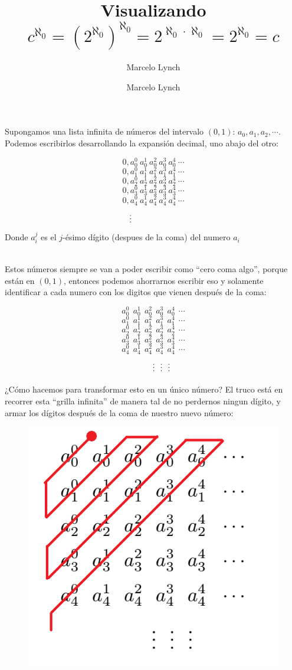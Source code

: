 \documentclass[10pt,a4paper]{article}
\author{Marcelo Lynch}
\title{\vspace{-1.6cm}Visualizando $c^{\aleph_0} = (2^{\aleph_0})^{\aleph_0} = 2^{\aleph_0 \cdot \aleph_0} = 2^{\aleph_0} = c$ }
\author{Marcelo Lynch}
\date{}
\begin{document}
\maketitle


Supongamos una lista infinita de números del intervalo $(0,1)$: $a_0, a_1, a_2, \cdots$. Podemos escribirlos desarrollando la expansión decimal, uno abajo del otro:

\[ 0,a_0^0\ a_0^1\ a_0^2\ a_0^3\ a_0^4\ \cdots \]
\[ 0,a_1^0\ a_1^1\ a_1^2\ a_1^3\ a_1^4\ \cdots \]
\[ 0,a_2^0\ a_2^1\ a_2^2\ a_2^3\ a_2^4\ \cdots \]
\[ 0,a_3^0\ a_3^1\ a_3^2\ a_3^3\ a_3^4\ \cdots \]
\[ 0,a_4^0\ a_4^1\ a_4^2\ a_4^3\ a_4^4\ \cdots \]
\[\ \ \vdots\ \hspace{30px}  \hspace{30px} \]
Donde $a_i^j$ es el $j$-ésimo dígito (despues de la coma) del numero $a_i$\\\

Estos números siempre se van a poder escribir como ``cero coma algo'', porque están en $(0,1)$, entonces podemos ahorrarnos escribir eso y solamente identificar a cada numero con los digitos que vienen después de la coma:
 
\[ a_0^0\ \ a_0^1\ \ a_0^2\ \ a_0^3\ \ a_0^4\ \ \cdots \]
\[ a_1^0\ \ a_1^1\ \ a_1^2\ \ a_1^3\ \ a_1^4\ \ \cdots \]
\[ a_2^0\ \ a_2^1\ \ a_2^2\ \ a_2^3\ \ a_2^4\ \ \cdots \]
\[ a_3^0\ \ a_3^1\ \ a_3^2\ \ a_3^3\ \ a_3^4\ \ \cdots \]
\[ a_4^0\ \ a_4^1\ \ a_4^2\ \ a_4^3\ \ a_4^4\ \  \cdots \]
\[\ \ \ \ \ \ \hspace{50px} \vdots\ \ \vdots\ \ \vdots \hspace{50px} \]

¿Cómo hacemos para transformar esto en un único número? El truco está en recorrer esta ``grilla infinita'' de manera tal de no perdernos ningun dígito, y armar los dígitos después de la coma de nuestro nuevo número:

\begin{figure}[h!]
\centering
\includegraphics[scale=0.6]{diago2.png}
\end{figure}
\end{document}
